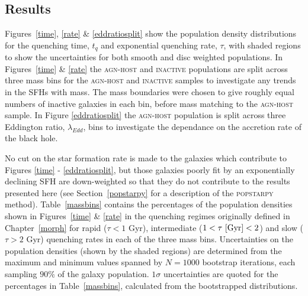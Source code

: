 \subsection{Results}\label{results}

Figures~\ref{time}, \ref{rate} \& \ref{eddratiosplit} show the population density distributions for the quenching time, $t_q$ and exponential quenching rate, $\tau$, with shaded regions to show the uncertainties for both smooth and disc weighted populations. In Figures~\ref{time} \& \ref{rate} the \textsc{agn-host} and \textsc{inactive} populations are split across three mass bins for the \textsc{agn-host} and \textsc{inactive} samples to investigate any trends in the SFHs with mass. The mass boundaries were chosen to give roughly equal numbers of inactive galaxies in each bin, before mass matching to the \textsc{agn-host} sample. In Figure \ref{eddratiosplit} the \textsc{agn-host} population is split across three Eddington ratio, $\lambda_{Edd}$, bins to investigate the dependance on the accretion rate of the black hole. 

No cut on the star formation rate is made to the galaxies which contribute to Figures \ref{time} - \ref{eddratiosplit}, but those galaxies poorly fit by an exponentially declining SFH are down-weighted so that they do not contribute to the results presented here (see Section~\ref{popstarpy} for a description of the \textsc{popstarpy} method). Table~\ref{massbins} contains the percentages of the population densities shown in Figures~\ref{time} \& \ref{rate} in the quenching regimes originally defined in Chapter~\ref{morph} for rapid ($\tau < 1$ Gyr), intermediate ($1 < \tau ~\rm{[Gyr]} < 2$) and slow ($\tau > 2$ Gyr) quenching rates in each of the three mass bins. Uncertainties on the population densities (shown by the shaded regions) are determined from the maximum and minimum values spanned by $N = 1000$ bootstrap iterations, each sampling $90\%$ of the galaxy population. $1\sigma$ uncertainties are quoted for the percentages in Table~\ref{massbins}, calculated from the bootstrapped distributions.


